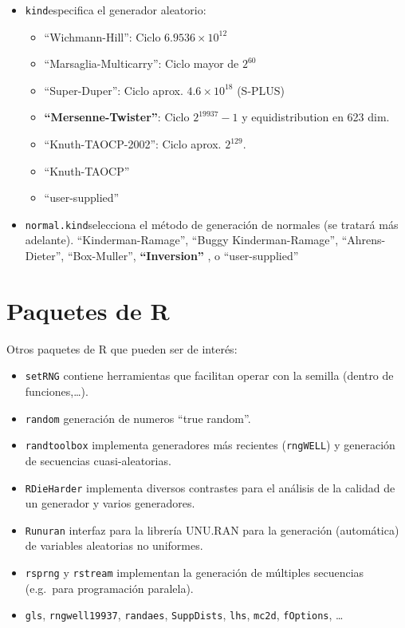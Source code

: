 \documentclass[]{book}
\theoremstyle{definition}
\theoremstyle{definition}
\theoremstyle{definition}
\theoremstyle{remark}
\begin{document}
\begin{itemize}
\item
  \texttt{kind}especifica el generador aleatorio:

  \begin{itemize}
  \item
    ``Wichmann-Hill'': Ciclo \(6.9536\times10^{12}\)
  \item
    ``Marsaglia-Multicarry'': Ciclo mayor de \(2^{60}\)
  \item
    ``Super-Duper'': Ciclo aprox. \(4.6\times10^{18}\) (S-PLUS)
  \item
    \textbf{``Mersenne-Twister''}: Ciclo \(2^{19937}-1\) y
    equidistribution en 623 dim.
  \item
    ``Knuth-TAOCP-2002'': Ciclo aprox. \(2^{129}\).
  \item
    ``Knuth-TAOCP''
  \item
    ``user-supplied''
  \end{itemize}
\item
  \texttt{normal.kind}selecciona el método de generación de normales (se
  tratará más adelante). ``Kinderman-Ramage'', ``Buggy
  Kinderman-Ramage'', ``Ahrens-Dieter'', ``Box-Muller'',
  \textbf{``Inversion''} , o ``user-supplied''
\end{itemize}

\section{Paquetes de R}\label{paquetes-de-r}

Otros paquetes de R que pueden ser de interés:

\begin{itemize}
\item
  \texttt{setRNG} contiene herramientas que facilitan operar con la
  semilla (dentro de funciones,\ldots{}).
\item
  \texttt{random} generación de numeros ``true random''.
\item
  \texttt{randtoolbox} implementa generadores más recientes
  (\texttt{rngWELL}) y generación de secuencias cuasi-aleatorias.
\item
  \texttt{RDieHarder} implementa diversos contrastes para el análisis de
  la calidad de un generador y varios generadores.
\item
  \texttt{Runuran} interfaz para la librería UNU.RAN para la generación
  (automática) de variables aleatorias no uniformes.
\item
  \texttt{rsprng} y \texttt{rstream} implementan la generación de
  múltiples secuencias (e.g.~para programación paralela).
\item
  \texttt{gls}, \texttt{rngwell19937}, \texttt{randaes},
  \texttt{SuppDists}, \texttt{lhs}, \texttt{mc2d}, \texttt{fOptions},
  \ldots{}
\end{itemize}
\end{document}

